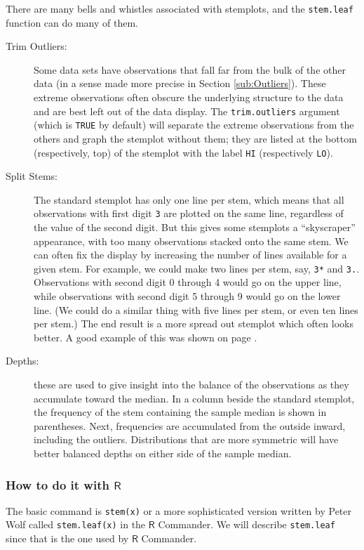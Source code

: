 \documentclass[captions=tableheading]{scrbook}
\begin{document}
There are many bells and whistles associated with stemplots, and the \texttt{stem.leaf} function can do many of them.

\begin{description}
\item[Trim Outliers:] Some data sets have observations that fall far from the bulk of the other data (in a sense made more precise in Section \ref{sub:Outliers}). These extreme observations often obscure the underlying structure to the data and are best left out of the data display. The \texttt{trim.outliers} argument (which is \texttt{TRUE} by default) will separate the extreme observations from the others and graph the stemplot without them; they are listed at the bottom (respectively, top) of the stemplot with the label \texttt{HI} (respectively \texttt{LO}).
\item[Split Stems:] The standard stemplot has only one line per stem, which means that all observations with first digit \texttt{3} are plotted on the same line, regardless of the value of the second digit. But this gives some stemplots a ``skyscraper'' appearance, with too many observations stacked onto the same stem. We can often fix the display by increasing the number of lines available for a given stem. For example, we could make two lines per stem, say, \texttt{3*} and \texttt{3.}. Observations with second digit 0 through 4 would go on the upper line, while observations with second digit 5 through 9 would go on the lower line. (We could do a similar thing with five lines per stem, or even ten lines per stem.) The end result is a more spread out stemplot which often looks better. A good example of this was shown on page \pageref{exa:stemleaf-multiple-lines-stem}.
\item[Depths:] these are used to give insight into the balance of the observations as they accumulate toward the median. In a column beside the standard stemplot, the frequency of the stem containing the sample median is shown in parentheses. Next, frequencies are accumulated from the outside inward, including the outliers. Distributions that are more symmetric will have better balanced depths on either side of the sample median.
\end{description}
\subsubsection{How to do it with \(\mathsf{R}\)}
\label{sec-2-4-1-1}


The basic command is \texttt{stem(x)} or a more sophisticated version written by Peter Wolf called \texttt{stem.leaf(x)} in the \(\mathsf{R}\) Commander. We will describe \texttt{stem.leaf} since that is the one used by \(\mathsf{R}\) Commander.
\end{document}
